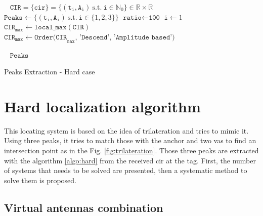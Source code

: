 \begin{algorithm}[H]
 \KwInput{}\
 \hspace*{\algorithmicindent} $\mathtt{CIR} = \{\mathtt{cir}\} = \{ (\mathtt{t_i}, \mathtt{A_i}) ~\text{s.t.} ~\mathtt{i} \in \mathbb{N}_0\} \in \mathbb{R} \times \mathbb{R}$ \;
\KwInit{}
\hspace*{\algorithmicindent} $\texttt{Peaks} \longleftarrow \{ (\mathtt{t_i}, \mathtt{A_i}) ~\text{s.t.} ~\mathtt{i} \in \{ 1, 2, 3 \} \}$\;
\hspace*{\algorithmicindent} $\texttt{ratio} \longleftarrow \texttt{100}$\;
\hspace*{\algorithmicindent} $\texttt{i} \longleftarrow 1$\;
\hspace*{\algorithmicindent} $\texttt{CIR}_\texttt{max} \longleftarrow \texttt{local\_max}(\texttt{CIR})$\;
\hspace*{\algorithmicindent} $\texttt{CIR}_\texttt{max} \longleftarrow \texttt{Order(CIR}_\texttt{max}\texttt{, 'Descend', 'Amplitude based')}$\;


 \KwOutput{}\
 \hspace*{\algorithmicindent} $\texttt{Peaks}$\;
 \caption{Peaks Extraction - Hard case \label{algo:hard}}
\end{algorithm}
\vspace{2mm}


\section{Hard localization algorithm}
\label{hard_loc}
This locating system is based on the idea of trilateration and tries to mimic it. Using three peaks, it tries to match those with the anchor and two \glspl{va} to find an intersection point as in the Fig. \ref{fig:trilateration}. Those three peaks are extracted with the algorithm \ref{algo:hard} from the received \gls{cir} at the tag. First, the number of systems that needs to be solved are presented, then a systematic method to solve them is proposed.

\subsection{Virtual antennas combination}

